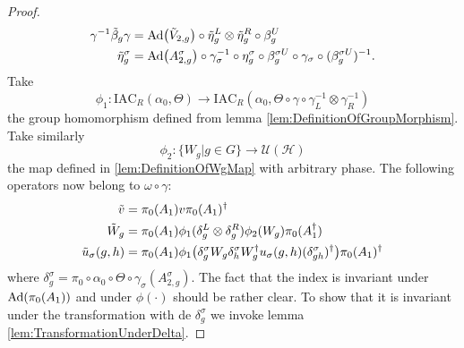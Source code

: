 \documentclass[12pt,a4paper,twoside]{article}
\let\originalleft\left
\let\originalright\right
\renewcommand{\left}{\mathopen{}\mathclose\bgroup\originalleft}
\renewcommand{\right}{\aftergroup\egroup\originalright}
\newcommand{\UU}{\mathcal U}
\newcommand{\HH}{\mathcal H}
\newcommand{\Ad}[1]{\textrm{Ad}\left(#1\right)}
\theoremstyle{definition}
\numberwithin{equation}{section}
\begin{document}
\begin{proof}
	\begin{align}
		\gamma^{-1}\tilde{\beta}_g\gamma&=\Ad{\tilde V_{2,g}}\circ\tilde{\eta}_g^L\otimes\tilde{\eta}_g^R\circ\beta_g^U\\
	\tilde{\eta}_g^\sigma&=\Ad{A_{2,g}^\sigma}\circ\gamma_{\sigma}^{-1}\circ\eta_g^\sigma\circ\beta_g^{\sigma U}\circ\gamma_{\sigma}\circ(\beta_g^{\sigma U})^{-1}.
	\end{align}
	Take
	\begin{equation}
		\phi_1:\textrm{IAC}_R(\alpha_0,\Theta) \rightarrow \textrm{IAC}_R(\alpha_0,\Theta\circ \gamma \circ \gamma_L^{-1}\otimes\gamma_R^{-1})
	\end{equation}
	the group homomorphism defined from lemma \ref{lem:DefinitionOfGroupMorphism}. Take similarly
	\begin{equation}
		\phi_2:\{W_g|g\in G\}\rightarrow \UU(\HH)
	\end{equation}
	the map defined in \ref{lem:DefinitionOfWgMap} with arbitrary phase. The following operators now belong to $\omega\circ\gamma:$
	\begin{align}
		\tilde{v}&=\pi_0(A_1)v\pi_0(A_1)^\dagger\\
		\tilde{W}_g&=\pi_0(A_1)\phi_1(\delta^L_g\otimes\delta^R_g)\phi_2( W_g)\pi_0(A_1^\dagger)\\
		\tilde u_\sigma(g,h)&=\pi_0(A_1) \phi_1\left(\delta^\sigma_g W_g\delta^\sigma_h W_g^\dagger u_\sigma(g,h)(\delta^\sigma_{gh})^\dagger\right)\pi_0(A_1)^\dagger
	\end{align}
	where $\delta^\sigma_g=\pi_0\circ\alpha_0\circ\Theta\circ\gamma_{\sigma}(A^\sigma_{2,g}).$ The fact that the index is invariant under $\Ad{\pi_0(A_1)}$ and under $\phi(\cdot)$ should be rather clear. To show that it is invariant under the transformation with de $\delta^\sigma_g$ we invoke lemma \ref{lem:TransformationUnderDelta}.
\end{proof}
\appendix
\end{document}
